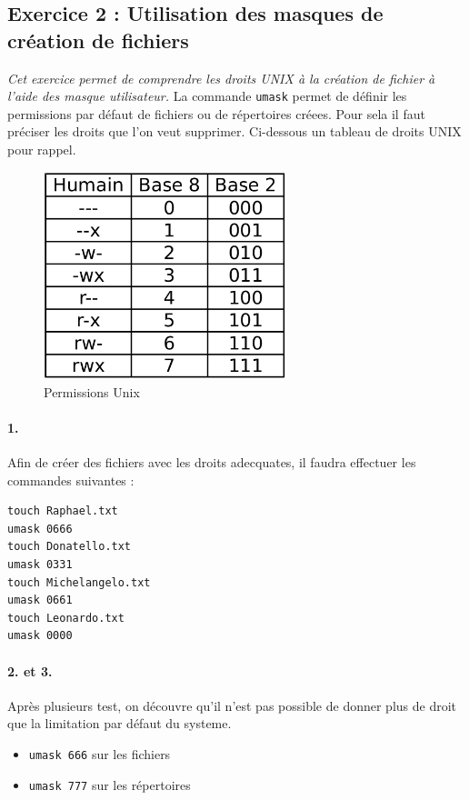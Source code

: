 \subsection{Exercice 2 : Utilisation des masques de création de fichiers}
\textit{Cet exercice permet de comprendre les droits UNIX à la création de fichier à l'aide des masque utilisateur.}
La commande \texttt{umask} permet de définir les permissions par défaut de fichiers ou de répertoires  créees. Pour sela il faut préciser les droits que l'on veut supprimer.
Ci-dessous un tableau de droits UNIX pour rappel.

\begin{figure}[!h]
\centering
\includegraphics[width=200pt]{./shell/Pictures/permissions}
\caption{Permissions Unix}
\label{Permissions Unix}
\end{figure}

\paragraph{1.}
Afin de créer des fichiers avec les droits adecquates, il faudra effectuer les commandes suivantes :
\begin{verbatim}
touch Raphael.txt
umask 0666
touch Donatello.txt
umask 0331
touch Michelangelo.txt
umask 0661
touch Leonardo.txt
umask 0000
\end{verbatim}

\paragraph{2. et 3.}
Après plusieurs test, on découvre qu'il n'est pas possible de donner plus de droit que la limitation par défaut du systeme.
\begin{itemize}
\item \texttt{umask 666} sur les fichiers
\item \texttt{umask 777} sur les répertoires
\end{itemize}

